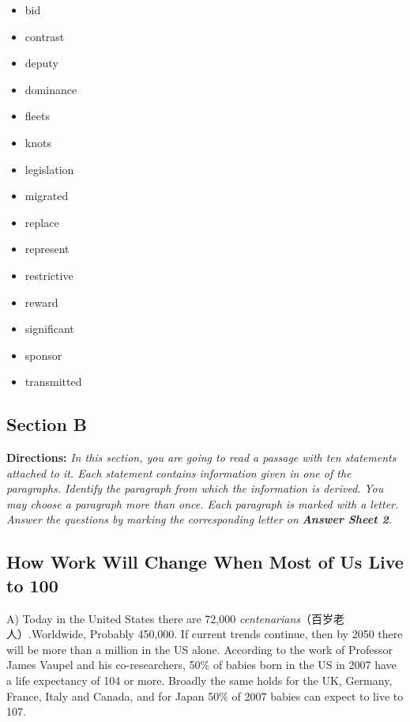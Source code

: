 \documentclass[UTF8,11pt]{ctexart}
\begin{document}
\begin{itemize}[leftmargin=2em,itemsep=.2em,topsep=.4em]\item[A.] bid
\item[B.] contrast
\item[C.] deputy
\item[D.] dominance
\item[E.] fleets
\item[F.] knots
\item[G.] legislation
\item[H.] migrated
\item[I.] replace
\item[J.] represent
\item[K.] restrictive
\item[L.] reward
\item[M.] significant
\item[N.] sponsor
\item[O.] transmitted
\end{itemize}

\subsection*{\textbf{Section B}}


\textbf{Directions:}\textit{ In this section, you are going to read a passage with ten statements attached to it. Each statement} \textit{contains information given in one of the paragraphs. Identify the paragraph from which the information is derived.} \textit{You may choose a paragraph more than once. Each paragraph is marked with a letter. Answer the questions by} \textit{marking the corresponding letter on}\textbf{\textit{ Answer Sheet 2}}\textit{.}


\subsection*{\textbf{How Work Will Change When Most of Us Live to 100}}


A) Today in the United States there are 72,000\textit{ centenarians}（百岁老人）.Worldwide, Probably 450,000. If current trends continue, then by 2050 there will be more than a million in the US alone. According to the work of Professor James Vaupel and his co-researchers, 50\% of babies born in the US in 2007 have a life expectancy of 104 or more. Broadly the same holds for the UK, Germany, France, Italy and Canada, and for Japan 50\% of 2007 babies can expect to live to 107.
\end{document}

